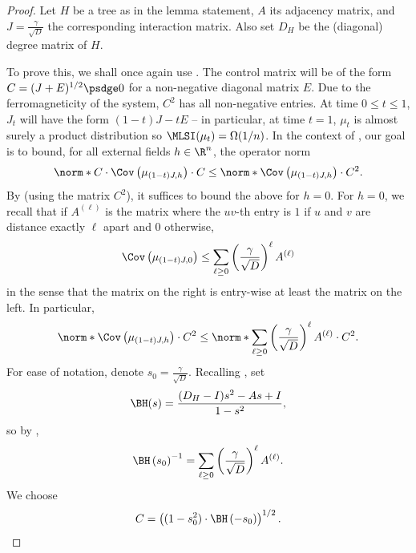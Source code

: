 \documentclass[11pt,letterpaper]{article}
\begin{document}
    \begin{proof}
        Let $H$ be a tree as in the lemma statement, $A$ its adjacency matrix, and $J = \frac{\gamma}{\sqrt{D}}$ the corresponding interaction matrix. Also set $D_H$ be the (diagonal) degree matrix of $H$.

        To prove this, we shall once again use . The control matrix will be of the form $C = (J+E)^{1/2} \psdge 0$ for a non-negative diagonal matrix $E$. Due to the ferromagneticity of the system, $C^2$ has all non-negative entries. At time $0 \le t \le 1$, $J_t$ will have the form $(1-t) J - tE$ -- in particular, at time $t=1$, $\mu_t$ is almost surely a product distribution so $\MLSI(\mu_t) = \Omega(1/n)$. In the context of , our goal is to bound, for all external fields $h \in \R^n$, the operator norm
        \begin{equation}
            \label{eq:bethe-hessian-coincidence-1}
            \norm*{C \cdot \Cov\left( \mu_{(1-t)J,h} \right) \cdot C} \le \norm*{\Cov\left( \mu_{(1-t)J,h} \right) \cdot C^2 }.
        \end{equation}
        By  (using the matrix $C^2$), it suffices to bound the above for $h = 0$. For $h = 0$, we recall that if $A^{(\ell)}$ is the matrix where the $uv$-th entry is $1$ if $u$ and $v$ are distance exactly $\ell$ apart and $0$ otherwise,
        \[ \Cov\left( \mu_{(1-t)J,0} \right) \le \sum_{\ell \ge 0} \left( \frac{\gamma}{\sqrt{D}} \right)^{\ell} A^{(\ell)} \]
        in the sense that the matrix on the right is entry-wise at least the matrix on the left.
        In particular,
        \begin{equation}
            \label{eq:bethe-hessian-coincidence-2}
            \norm*{\Cov\left( \mu_{(1-t)J,h} \right) \cdot C^2 } \le \norm*{ \sum_{\ell \ge 0} \left( \frac{\gamma}{\sqrt{D}} \right)^{\ell} A^{(\ell)} \cdot C^2 }.
        \end{equation}
        For ease of notation, denote $s_0 = \frac{\gamma}{\sqrt{D}}$. Recalling , set
        \[ \BH(s) = \frac{(D_H - I) s^2 - As + I}{1-s^2}, \]
        so by ,
        \[ \BH\left( s_0 \right)^{-1} = \sum_{\ell \ge 0} \left( \frac{\gamma}{\sqrt{D}} \right)^\ell A^{(\ell)}. \]
        We choose
        \begin{align}
            \label{eq:control-matrix-tree-mlsi}
            C = \left((1-s_0^2) \cdot \BH\left( - s_0 \right)\right)^{1/2} .
        \end{align}

\end{proof}
\end{document}
